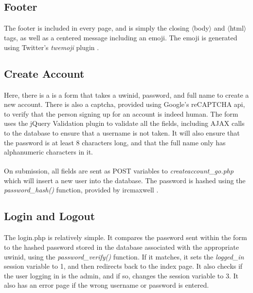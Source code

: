 \documentclass[11pt,letterpaper,titlepage]{article}
\begin{document}
        \subsection{Footer}
        \paragraph{}
        The footer is included in every page, and is simply the closing
        $\langle$body$\rangle$ and $\langle$html$\rangle$ tags, as well as a
        centered message including an emoji. The emoji is generated using
        Twitter's \emph{twemoji} plugin \cite{twemoji}.

        \subsection{Create Account}
        \paragraph{}
        Here, there is a is a form that takes a uwinid, password, and full
        name to create a new account. There is also a captcha, provided using
        Google's reCAPTCHA api, to verify that the person signing up for an
        account is indeed human. The form uses the jQuery Validation plugin
        \cite{validate} to validate all the fields, including AJAX calls to the
        database to ensure that a username is not taken. It will also ensure
        that the password is at least 8 characters long, and that the full name
        only has alphanumeric characters in it.

        \paragraph{}
        On submission, all fields are sent as POST variables to
        \emph{createaccount\_go.php} which will insert a new user into the
        database. The password is hashed using the \emph{password\_hash()}
        function, provided by ircmaxwell \cite{password}.

        \subsection{Login and Logout}
        \paragraph{}
        The login.php is relatively simple. It compares the password sent within
        the form to the hashed password stored in the database associated with
        the appropriate uwinid, using the \emph{password\_verify()} function.
        If it matches, it sets the \emph{logged\_in}
        session variable to 1, and then redirects back to the index page. It
        also checks if the user logging in is the admin, and if so, changes the
        session variable to 3. It also has an error page if the wrong username
        or password is entered.
\end{document}
